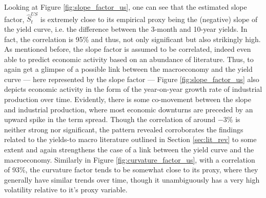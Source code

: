 Looking at Figure \ref{fig:slope_factor_us}, one can see that the estimated slope factor, $\hat{S}^{US}_{t}$ is extremely close to its empirical proxy being the (negative) slope of the yield curve, i.e. the difference between the 3-month and 10-year yields. 
In fact, the correlation is 95\% and thus, not only significant but also strikingly high.
As mentioned before, the slope factor is assumed to be correlated, indeed even able to predict economic activity based on an abundance of literature. 
Thus, to again get a glimpse of a possible link between the macroeconomy and the yield curve --- here represented by the slope factor --- Figure \ref{fig:slope_factor_us} also depicts economic activity in the form of the year-on-year growth rate of industrial production over time. 
Evidently, there is some co-movement between the slope and industrial production, where most economic downturns are preceded by an upward spike in the term spread. Though the correlation of around $-3\%$ is neither strong nor significant, the pattern revealed corroborates the findings related to the yields-to macro literature outlined in Section \ref{sec:lit_rev} to some extent and again strengthens the case of a link between the yield curve and the macroeconomy. 
Similarly in Figure \ref{fig:curvature_factor_us}, with a correlation of 93\%, the curvature factor tends to be somewhat close to its proxy, where they generally have similar trends over time, though it unambiguously has a very high volatility relative to it's proxy variable. 

